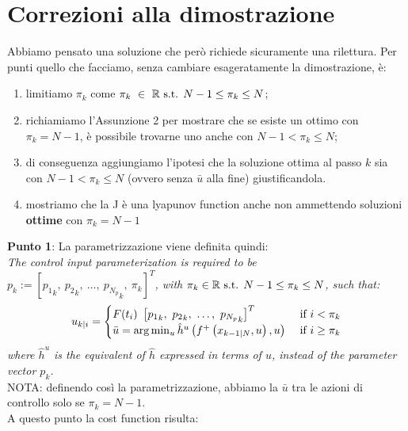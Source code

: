 \documentclass[12pt]{article}
\begin{document}
\section*{Correzioni alla dimostrazione}

Abbiamo pensato una soluzione che però richiede sicuramente una rilettura.
Per punti quello che facciamo, senza cambiare esageratamente la dimostrazione, è:
\begin{enumerate}
\item limitiamo $\pi_k$ come  $\pi_k\ \in\  \mathbb{R} \textnormal{ s.t. } N-1 \leq \pi_k \leq N$;
\item richiamiamo l'Assunzione 2 per mostrare che se esiste un ottimo con $\pi_k = N-1$, è possibile trovarne uno anche con $N-1 < \pi_k \leq N$;
\item di conseguenza aggiungiamo l'ipotesi che la soluzione ottima al passo $k$ sia con $N-1 < \pi_k \leq N$ (ovvero senza $\bar{u}$ alla fine) giustificandola.
\item mostriamo che la J è una lyapunov function anche non ammettendo soluzioni \textbf{ottime} con $\pi_k = N-1$
\end{enumerate}

\textbf{Punto 1}:
La parametrizzazione viene definita quindi: \\

\textit{The control input parameterization is required to be $p_k:=[{p_1}_k,\ {p_2}_k,\ \dots,\ {p_{N_p}}_k,\ \pi_k]^T$, with $\pi_k \in \mathbb{R} \textnormal{ s.t. } N-1 \leq \pi_k \leq N$, such that: 
\begin{equation*}
\begin{split}
    u_{k|i}=
        \begin{cases}
            F(t_i)\ \left[{p_1}_k,\ {p_2}_k,\ \dots,\ {p_{N_p}}_k\right]^T &\textnormal{if } i<\pi_k \\
            \Bar{u}=\arg\min_u \hat{h}^u\left({f}^+\left(x_{k-1|N},u\right),u\right)  \ &\textnormal{if } i\ge \pi_k
        \end{cases}
    \end{split}
\end{equation*}
where $\hat{h}^u$ is the equivalent of $\hat{h}$ expressed in terms of $u$, instead of the parameter vector $p_k$.} \\

NOTA: definendo così la parametrizzazione, abbiamo la $\bar{u}$ tra le azioni di controllo solo se $\pi_k = N-1 $. \\ 
A questo punto la cost function risulta: 
\end{document}
